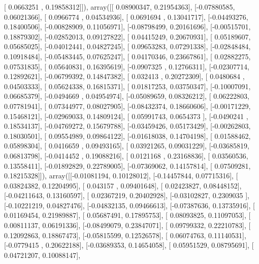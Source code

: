 \documentclass{article}
\begin{document}
       [ 0.0663251 ,  0.19858312]]), array([[ 0.08900347,  0.21954363],
       [-0.07880585,  0.06021366],
       [ 0.0966774 ,  0.04534936],
       [ 0.0691694 ,  0.13041717],
       [-0.04493276,  0.18400506],
       [-0.00828909,  0.11056971],
       [-0.08798499,  0.20161696],
       [-0.00515701,  0.18879302],
       [-0.02852013,  0.09127822],
       [ 0.04415249,  0.20670931],
       [ 0.05189607,  0.05685025],
       [-0.04012441,  0.04827245],
       [ 0.09653283,  0.07291338],
       [-0.02848484,  0.10918484],
       [-0.05483445,  0.07625247],
       [ 0.04170346,  0.23667861],
       [ 0.02882275,  0.07531835],
       [ 0.05640831,  0.16395619],
       [-0.0907325 ,  0.12766311],
       [-0.02307714,  0.12892621],
       [-0.06799392,  0.14847382],
       [ 0.032413  ,  0.20272309],
       [ 0.0480684 ,  0.04503333],
       [ 0.05624338,  0.16815371],
       [ 0.01817253,  0.03750347],
       [-0.10007091,  0.06685379],
       [-0.0494669 ,  0.04954974],
       [-0.05089659,  0.08326212],
       [ 0.06222803,  0.07781941],
       [ 0.07344977,  0.08027905],
       [-0.08432374,  0.18660606],
       [-0.00171229,  0.15468121],
       [-0.02969033,  0.14809124],
       [ 0.05991743,  0.0654373 ],
       [-0.0490241 ,  0.18534137],
       [-0.04769272,  0.15679788],
       [-0.03459426,  0.05173429],
       [-0.00262803,  0.18030501],
       [ 0.09554989,  0.09864122],
       [-0.01618038,  0.14704198],
       [ 0.01588462,  0.05898304],
       [ 0.0416659 ,  0.09493165],
       [ 0.03921265,  0.09031229],
       [-0.03685819,  0.06813798],
       [-0.0414452 ,  0.19088216],
       [ 0.0121168 ,  0.23168836],
       [ 0.03560536,  0.13558411],
       [-0.01892829,  0.22789005],
       [-0.07369062,  0.14157814],
       [ 0.07509281,  0.18215328]]), array([[-0.01081194,  0.10128012],
       [-0.14457844,  0.07715316],
       [ 0.03824382,  0.12204995],
       [ 0.043157  ,  0.09401648],
       [ 0.02423827,  0.08448152],
       [-0.04211643,  0.13160597],
       [ 0.02367219,  0.20402928],
       [-0.03102827,  0.2309035 ],
       [-0.10221219,  0.04827476],
       [-0.04832135,  0.09466613],
       [-0.07387636,  0.13735916],
       [ 0.01169454,  0.21989887],
       [ 0.05687491,  0.17895753],
       [ 0.08093825,  0.11097053],
       [ 0.00811137,  0.06191336],
       [-0.08499079,  0.23847071],
       [ 0.09799332,  0.22210783],
       [ 0.12092863,  0.18867473],
       [-0.05815599,  0.12526578],
       [ 0.06074763,  0.11140531],
       [-0.0779415 ,  0.20622188],
       [-0.03689353,  0.14654058],
       [ 0.05951529,  0.08795691],
       [ 0.04721207,  0.10088147],
\end{document}
